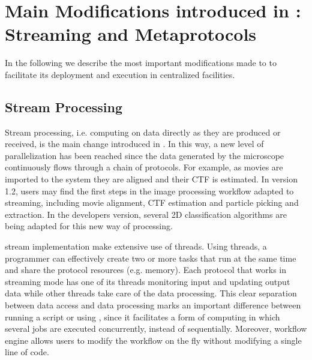 \section{Main Modifications introduced in  \scipion: Streaming and Metaprotocols}
\label{overall}

In the following we describe the most important modifications made to \scipion to facilitate its deployment and execution in centralized facilities.

\subsection{Stream Processing}

Stream processing, i.e. computing on data directly as they are produced or received, is the main change introduced in \scipion. 
In this way, a new level of parallelization has been reached since the  data generated by the microscope continuously flows through a chain of protocols. For example, as movies are imported to the system they are aligned and their CTF is estimated. In \scipion version 1.2, users may find  the first steps in the image processing workflow adapted to streaming, including movie alignment,  CTF estimation and particle picking and extraction. In the developers version, several 2D classification algorithms are being adapted for this new way of processing.

\scipion stream implementation make extensive use of threads. %
Using threads, a programmer can effectively create two or more tasks that run at the same time and share the protocol resources (e.g. memory). 
Each protocol that works in streaming mode has one of its threads monitoring input and updating output  data while other threads take care of the data processing. This clear separation between data access and data processing marks an important difference between running a script or using \scipion, since it facilitates a form of computing in which several jobs are executed  concurrently, instead of sequentially. Moreover, \scipion workflow engine allows users to modify the workflow on the fly without modifying a single line of code.

